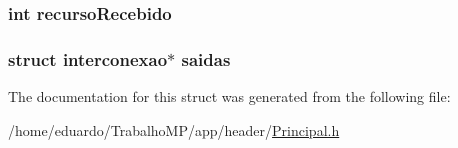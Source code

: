\hypertarget{structadaptador_a34541bd6c7eec1f2049716b02efe9572}{
\subsubsection[{recurso\-Recebido}]{\setlength{\rightskip}{0pt plus 5cm}int recurso\-Recebido}}\label{structadaptador_a34541bd6c7eec1f2049716b02efe9572}
\hypertarget{structadaptador_a788fad8a0ec948140f9c2a340be29a09}{
\subsubsection[{saidas}]{\setlength{\rightskip}{0pt plus 5cm}struct {\bf interconexao}$\ast$ saidas}}\label{structadaptador_a788fad8a0ec948140f9c2a340be29a09}


The documentation for this struct was generated from the following file\-:\begin{DoxyCompactItemize}
\item 
/home/eduardo/\-Trabalho\-M\-P/app/header/\hyperlink{_principal_8h}{Principal.\-h}\end{DoxyCompactItemize}
